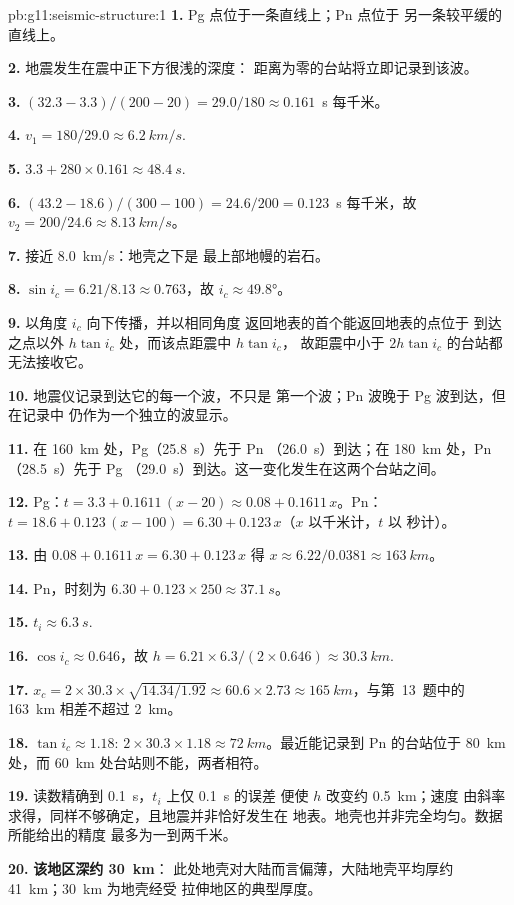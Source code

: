 \begin{solution}{pb:g11:seismic-structure:1}
\textbf{1.} Pg 点位于一条直线上；Pn 点位于
另一条较平缓的直线上。

\textbf{2.} 地震发生在震中正下方很浅的深度：
距离为零的台站将立即记录到该波。

\textbf{3.} $(32.3 - 3.3)/(200 - 20) = 29.0/180 \approx \num{0.161}$~\unit{s}
每千米。

\textbf{4.} $v_1 = 180/29.0 \approx \qty{6.2}{km/s}$.

\textbf{5.} $3.3 + 280 \times 0.161 \approx \qty{48.4}{s}$.

\textbf{6.} $(43.2 - 18.6)/(300 - 100) = 24.6/200 = \num{0.123}$~\unit{s}
每千米，故 $v_2 = 200/24.6 \approx \qty{8.13}{km/s}$。

\textbf{7.} 接近 \qty{8.0}{km/s}：地壳之下是
最上部地幔的岩石。

\textbf{8.} $\sin i_c = 6.21/8.13 \approx 0.763$，故 $i_c \approx
\ang{49.8}$。

\textbf{9.} 以角度 $i_c$ 向下传播，并以相同角度
返回地表的首个能返回地表的点位于
到达之点以外 $h\tan i_c$ 处，而该点距震中 $h\tan i_c$，
故距震中小于 $2h\tan i_c$ 的台站都无法接收它。

\textbf{10.} 地震仪记录到达它的每一个波，不只是
第一个波；Pn 波晚于 Pg 波到达，但在记录中
仍作为一个独立的波显示。

\textbf{11.} 在 \qty{160}{km} 处，Pg（\qty{25.8}{s}）先于 Pn
（\qty{26.0}{s}）到达；在 \qty{180}{km} 处，Pn（\qty{28.5}{s}）先于 Pg
（\qty{29.0}{s}）到达。这一变化发生在这两个台站之间。

\textbf{12.} Pg：$t = 3.3 + 0.1611\,(x - 20) \approx 0.08 + 0.1611\,x$。Pn：
$t = 18.6 + 0.123\,(x - 100) = 6.30 + 0.123\,x$（$x$ 以千米计，$t$ 以
秒计）。

\textbf{13.} 由 $0.08 + 0.1611\,x = 6.30 + 0.123\,x$ 得 $x \approx
6.22/0.0381 \approx \qty{163}{km}$。

\textbf{14.} Pn，时刻为 $6.30 + 0.123 \times 250 \approx \qty{37.1}{s}$。

\textbf{15.} $t_i \approx \qty{6.3}{s}$.

\textbf{16.} $\cos i_c \approx 0.646$，故 $h = 6.21 \times 6.3/(2 \times
0.646) \approx \qty{30.3}{km}$.

\textbf{17.} $x_c = 2 \times 30.3 \times \sqrt{14.34/1.92} \approx 60.6 \times
2.73 \approx \qty{165}{km}$，与第~13~题中的 \qty{163}{km}
相差不超过 \qty{2}{km}。

\textbf{18.} $\tan i_c \approx 1.18$: $2 \times 30.3 \times 1.18 \approx
\qty{72}{km}$。最近能记录到 Pn 的台站位于 \qty{80}{km} 处，而
\qty{60}{km} 处台站则不能，两者相符。

\textbf{19.} 读数精确到 \qty{0.1}{s}，$t_i$ 上仅 \qty{0.1}{s} 的误差
便使 $h$ 改变约 \qty{0.5}{km}；速度
由斜率求得，同样不够确定，且地震并非恰好发生在
地表。地壳也并非完全均匀。数据所能给出的精度
最多为一到两千米。

\textbf{20.} \textbf{该地区深约 \qty{30}{km}}：
此处地壳对大陆而言偏薄，大陆地壳平均厚约
\qty{41}{km}；\qty{30}{km} 为地壳经受
拉伸地区的典型厚度。
\end{solution}

